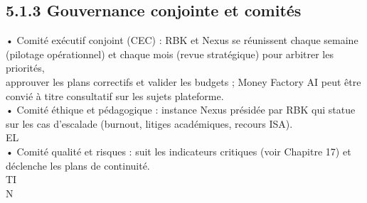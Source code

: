 \subsection{5.1.3 Gouvernance conjointe et comités}
• Comité exécutif conjoint (CEC) : RBK et Nexus se réunissent chaque semaine (pilotage opérationnel) et chaque mois (revue stratégique) pour arbitrer les priorités,\\
approuver les plans correctifs et valider les budgets ; Money Factory AI peut être convié à titre consultatif sur les sujets plateforme.\\
• Comité éthique et pédagogique : instance Nexus présidée par RBK qui statue sur les cas d’escalade (burnout, litiges académiques, recours ISA).\\
\vspace{0.5em}
\vspace{0.5em}
\vspace{0.5em}
\vspace{0.5em}
EL\\
• Comité qualité et risques : suit les indicateurs critiques (voir Chapitre 17) et déclenche les plans de continuité.\\
\vspace{0.5em}
\vspace{0.5em}
\vspace{0.5em}
\vspace{0.5em}
TI\\
N\\
